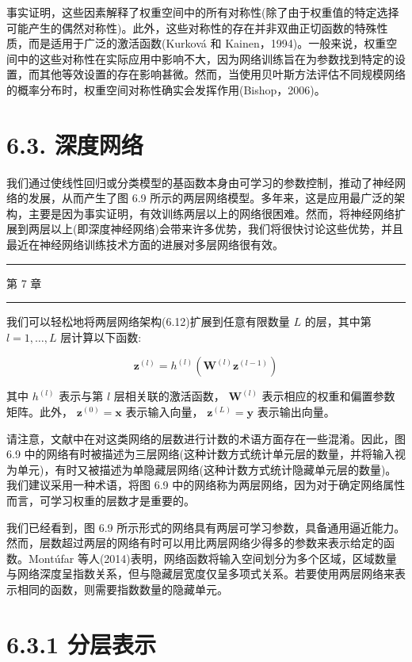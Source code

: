 \documentclass[10pt]{report}
\newcommand{\HRule}{\begin{center}\rule{0.9\linewidth}{0.2mm}\end{center}}
\begin{document}
事实证明，这些因素解释了权重空间中的所有对称性(除了由于权重值的特定选择可能产生的偶然对称性)。此外，这些对称性的存在并非双曲正切函数的特殊性质，而是适用于广泛的激活函数(Kurková 和 Kainen，1994)。一般来说，权重空间中的这些对称性在实际应用中影响不大，因为网络训练旨在为参数找到特定的设置，而其他等效设置的存在影响甚微。然而，当使用贝叶斯方法评估不同规模网络的概率分布时，权重空间对称性确实会发挥作用(Bishop，2006)。

\section*{6.3. 深度网络}

我们通过使线性回归或分类模型的基函数本身由可学习的参数控制，推动了神经网络的发展，从而产生了图 6.9 所示的两层网络模型。多年来，这是应用最广泛的架构，主要是因为事实证明，有效训练两层以上的网络很困难。然而，将神经网络扩展到两层以上(即深度神经网络)会带来许多优势，我们将很快讨论这些优势，并且最近在神经网络训练技术方面的进展对多层网络很有效。

\HRule

第 7 章

\HRule

我们可以轻松地将两层网络架构(6.12)扩展到任意有限数量 \(L\) 的层，其中第 \(l = 1,\ldots ,L\) 层计算以下函数:

\[
{\mathbf{z}}^{\left( l\right) } = {h}^{\left( l\right) }\left( {{\mathbf{W}}^{\left( l\right) }{\mathbf{z}}^{\left( l - 1\right) }}\right)  \tag{6.19}
\]

其中 \({h}^{\left( l\right) }\) 表示与第 \(l\) 层相关联的激活函数， \({\mathbf{W}}^{\left( l\right) }\) 表示相应的权重和偏置参数矩阵。此外， \({\mathbf{z}}^{\left( 0\right) } = \mathbf{x}\) 表示输入向量， \({\mathbf{z}}^{\left( L\right) } = \mathbf{y}\) 表示输出向量。

请注意，文献中在对这类网络的层数进行计数的术语方面存在一些混淆。因此，图 6.9 中的网络有时被描述为三层网络(这种计数方式统计单元层的数量，并将输入视为单元)，有时又被描述为单隐藏层网络(这种计数方式统计隐藏单元层的数量)。我们建议采用一种术语，将图 6.9 中的网络称为两层网络，因为对于确定网络属性而言，可学习权重的层数才是重要的。

我们已经看到，图 6.9 所示形式的网络具有两层可学习参数，具备通用逼近能力。然而，层数超过两层的网络有时可以用比两层网络少得多的参数来表示给定的函数。Montúfar 等人(2014)表明，网络函数将输入空间划分为多个区域，区域数量与网络深度呈指数关系，但与隐藏层宽度仅呈多项式关系。若要使用两层网络来表示相同的函数，则需要指数数量的隐藏单元。

\section*{6.3.1 分层表示}
\end{document}
